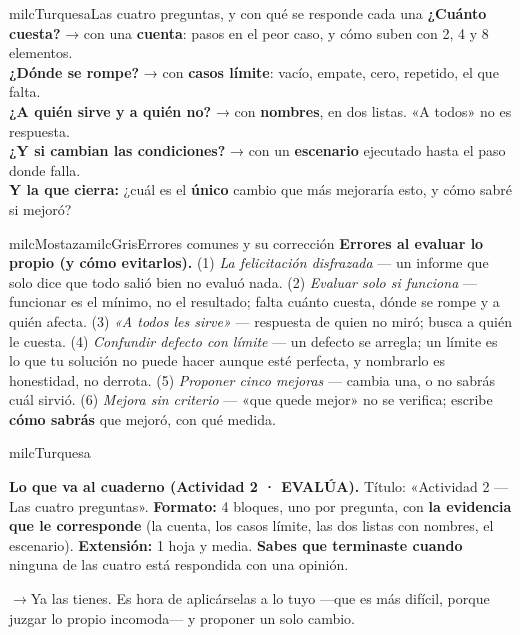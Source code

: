 \documentclass[11pt,letterpaper]{article}
\newcommand{\puente}[1]{%
  \begin{puentebox}%
    \textcolor{milcGradeDark}{$\rightarrow$}\hspace{2mm}#1%
  \end{puentebox}%
}
\begin{document}
\begin{drawbox}{milcTurquesa}{Las cuatro preguntas, y con qué se responde cada una}
\textbf{¿Cuánto cuesta?} → con una \textbf{cuenta}: pasos en el peor caso, y cómo suben con 2, 4 y 8 elementos. \\[1mm]
\textbf{¿Dónde se rompe?} → con \textbf{casos límite}: vacío, empate, cero, repetido, el que falta. \\[1mm]
\textbf{¿A quién sirve y a quién no?} → con \textbf{nombres}, en dos listas. «A todos» no es respuesta. \\[1mm]
\textbf{¿Y si cambian las condiciones?} → con un \textbf{escenario} ejecutado hasta el paso donde falla. \\[1mm]
\textbf{Y la que cierra:} ¿cuál es el \textbf{único} cambio que más mejoraría esto, y cómo sabré si mejoró?
\end{drawbox}

\begin{softbox}{milcMostaza}{milcGris}{Errores comunes y su corrección}
\textbf{Errores al evaluar lo propio (y cómo evitarlos).} (1) \emph{La felicitación disfrazada} --- un informe que solo dice que todo salió bien no evaluó nada. (2) \emph{Evaluar solo si funciona} --- funcionar es el mínimo, no el resultado; falta cuánto cuesta, dónde se rompe y a quién afecta. (3) \emph{«A todos les sirve»} --- respuesta de quien no miró; busca a quién le cuesta. (4) \emph{Confundir defecto con límite} --- un defecto se arregla; un límite es lo que tu solución no puede hacer aunque esté perfecta, y nombrarlo es honestidad, no derrota. (5) \emph{Proponer cinco mejoras} --- cambia una, o no sabrás cuál sirvió. (6) \emph{Mejora sin criterio} --- «que quede mejor» no se verifica; escribe \textbf{cómo sabrás} que mejoró, con qué medida.
\end{softbox}

\begin{infoband}{milcTurquesa}


\textbf{Lo que va al cuaderno (Actividad 2 · EVALÚA).} Título: «Actividad 2 --- Las cuatro preguntas». \textbf{Formato:} 4 bloques, uno por pregunta, con \textbf{la evidencia que le corresponde} (la cuenta, los casos límite, las dos listas con nombres, el escenario). \textbf{Extensión:} 1 hoja y media. \textbf{Sabes que terminaste cuando} ninguna de las cuatro está respondida con una opinión.
\end{infoband}

\puente{Ya las tienes. Es hora de aplicárselas a lo tuyo ---que es más difícil, porque juzgar lo propio incomoda--- y proponer un solo cambio.}
\end{document}
